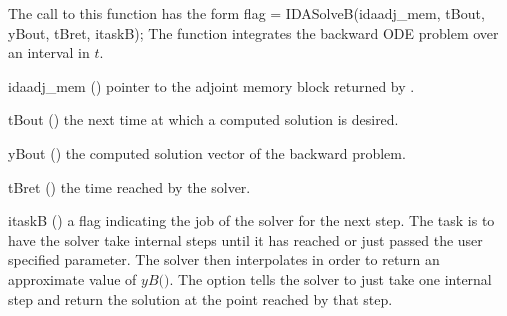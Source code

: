 The call to this function has the form
{
  flag = IDASolveB(idaadj\_mem, tBout, yBout, tBret, itaskB);
}
{
  The function  integrates the backward ODE problem over an 
  interval in $t$.
}
{
  \begin{args}
  \item[idaadj\_mem] ()
    pointer to the adjoint memory block returned by .
  \item[tBout] ()
    the next time at which a computed solution is desired.
  \item[yBout] ()
    the computed solution vector of the backward problem.
  \item[tBret] ()
    the time reached by the solver.
  \item[itaskB] ()
    a flag indicating the job of the solver for the next step. 
    The  task is to have the solver take internal steps until   
    it has reached or just passed the user specified 
    parameter. The solver then interpolates in order to   
    return an approximate value of $yB($$)$. 
    The  option tells the solver to just take one internal step  
    and return the solution at the point reached by that step. 
  \end{args}
}
